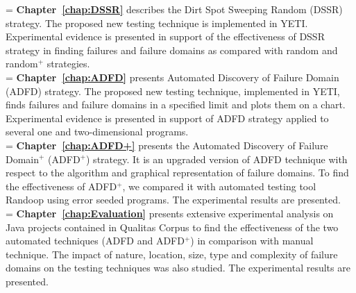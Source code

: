 \hangindent=\parindent
{}
\noindent
\textbf{Chapter~\ref{chap:DSSR}} describes the Dirt Spot Sweeping Random (DSSR) strategy. The proposed new testing technique is implemented in YETI. Experimental evidence is presented in support of the effectiveness of DSSR strategy in finding failures and failure domains as compared with random and random$^+$ strategies. \\

\hangindent=\parindent
{}
\noindent
\textbf{Chapter~\ref{chap:ADFD}} presents Automated Discovery of Failure Domain (ADFD) strategy. The proposed new testing technique, implemented in YETI, finds failures and failure domains in a specified limit and plots them on a chart. Experimental evidence is presented in support of ADFD strategy applied to several one and two-dimensional programs. \\

 
\hangindent=\parindent
{}
\noindent
\textbf{Chapter~\ref{chap:ADFD+}} presents the Automated Discovery of Failure Domain$^+$ (ADFD$^+$) strategy. It is an upgraded version of ADFD technique with respect to the algorithm and graphical representation of failure domains. To find the effectiveness of ADFD$^+$, we compared it with automated testing tool Randoop using error seeded programs. The experimental results are presented.\\ 


\hangindent=\parindent
{}
\noindent
\textbf{Chapter~\ref{chap:Evaluation}} presents extensive experimental analysis on Java projects contained in Qualitas Corpus to find the effectiveness of the two automated techniques (ADFD and ADFD$^+$) in comparison with manual technique. The impact of nature, location, size, type and complexity of failure domains on the testing techniques was also studied. The experimental results are presented. \\

